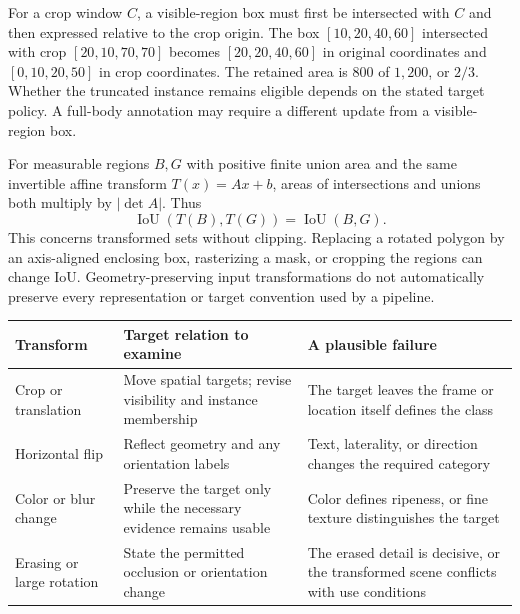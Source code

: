 For a crop window $C$, a visible-region box must first be intersected with $C$ and then expressed relative to the crop origin. The box $[10,20,40,60]$ intersected with crop $[20,10,70,70]$ becomes $[20,20,40,60]$ in original coordinates and $[0,10,20,50]$ in crop coordinates. The retained area is $800$ of $1{,}200$, or $2/3$. Whether the truncated instance remains eligible depends on the stated target policy. A full-body annotation may require a different update from a visible-region box.

For measurable regions $B,G$ with positive finite union area and the same invertible affine transform $T(x)=Ax+b$, areas of intersections and unions both multiply by $|\det A|$. Thus
\[
\operatorname{IoU}(T(B),T(G))=\operatorname{IoU}(B,G).
\]
This concerns transformed sets without clipping. Replacing a rotated polygon by an axis-aligned enclosing box, rasterizing a mask, or cropping the regions can change IoU. Geometry-preserving input transformations do not automatically preserve every representation or target convention used by a pipeline.

\par\addvspace{\intextsep}\noindent\begin{minipage}{\linewidth}
\centering\small
\begin{tabular}{@{}L{2.1cm}L{3.5cm}L{4.1cm}@{}}
\toprule
Transform & Target relation to examine & A plausible failure \\
\midrule
Crop or translation & Move spatial targets; revise visibility and instance membership & The target leaves the frame or location itself defines the class \\
Horizontal flip & Reflect geometry and any orientation labels & Text, laterality, or direction changes the required category \\
Color or blur change & Preserve the target only while the necessary evidence remains usable & Color defines ripeness, or fine texture distinguishes the target \\
Erasing or large rotation & State the permitted occlusion or orientation change & The erased detail is decisive, or the transformed scene conflicts with use conditions \\
\bottomrule
\end{tabular}
\label{tab:augmentation-claims}
\end{minipage}\par\addvspace{\intextsep}

